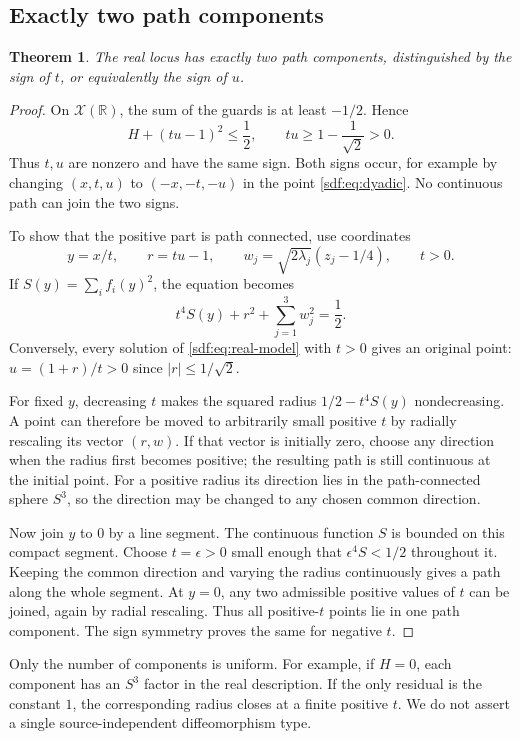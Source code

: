 \documentclass[11pt,a4paper]{article}
\newtheorem{theorem}{Theorem}[section]
\theoremstyle{definition}
\theoremstyle{remark}
\newcommand{\R}{\mathbb R}
\newcommand{\variety}{\mathcal X}
\begin{document}
\subsection{Exactly two path components}

\begin{theorem}\label{sdf:thm:components}
The real locus has exactly two path components, distinguished by the sign
of $t$, or equivalently the sign of $u$.
\end{theorem}
\begin{proof}
On $\variety(\R)$, the sum of the guards is at least $-1/2$. Hence
\[
 H+(tu-1)^2\le\frac12,
 \qquad tu\ge1-\frac1{\sqrt2}>0.
\]
Thus $t,u$ are nonzero and have the same sign. Both signs occur, for example
by changing $(x,t,u)$ to $(-x,-t,-u)$ in the point
\eqref{sdf:eq:dyadic}. No continuous path can join the two signs.

To show that the positive part is path connected, use coordinates
\[
 y=x/t,\qquad r=tu-1,\qquad w_j=\sqrt{2\lambda_j}(z_j-1/4),\qquad t>0.
\]
If $S(y)=\sum_i f_i(y)^2$, the equation becomes
\begin{equation}\label{sdf:eq:real-model}
 t^4S(y)+r^2+\sum_{j=1}^3w_j^2=\frac12.
\end{equation}
Conversely, every solution of \eqref{sdf:eq:real-model} with $t>0$ gives an
original point: $u=(1+r)/t>0$ since $|r|\le1/\sqrt2$.

For fixed $y$, decreasing $t$ makes the squared radius
$1/2-t^4S(y)$ nondecreasing. A point can therefore be moved to arbitrarily
small positive $t$ by radially rescaling its vector $(r,w)$. If that vector
is initially zero, choose any direction when the radius first becomes
positive; the resulting path is still continuous at the initial point.
For a positive radius its direction lies in the path-connected sphere
$S^3$, so the direction may be changed to any chosen common direction.

Now join $y$ to $0$ by a line segment. The continuous function $S$ is bounded
on this compact segment. Choose $t=\epsilon>0$ small enough that
$\epsilon^4S<1/2$ throughout it. Keeping the common direction and varying
the radius continuously gives a path along the whole segment. At $y=0$,
any two admissible positive values of $t$ can be joined, again by radial
rescaling. Thus all positive-$t$ points lie in one path component. The sign
symmetry proves the same for negative $t$.
\end{proof}

Only the number of components is uniform. For example, if $H=0$, each
component has an $S^3$ factor in the real description. If the only residual
is the constant $1$, the corresponding radius closes at a finite positive
$t$. We do not assert a single source-independent diffeomorphism type.
\end{document}
